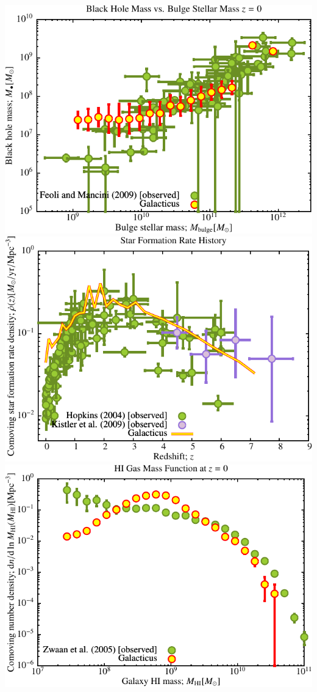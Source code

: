 \includegraphics[scale=0.6]{r256/h100/red_st14_log1/Plot_Black_Hole_vs_Bulge_Mass.pdf}
\includegraphics[scale=0.6]{r256/h100/red_st14_log1/Plot_Star_Formation_History.pdf} \\
\includegraphics[scale=0.6]{r256/h100/red_st14_log1/Plot_HI_Mass_Function.pdf}


